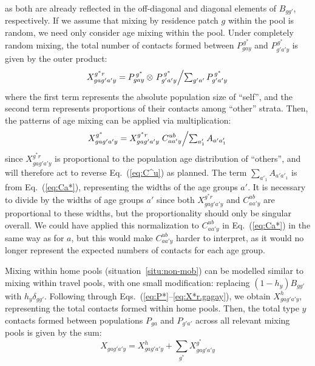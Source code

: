 as both are already reflected in the off-diagonal and diagonal elements of $B_{gg'}$, respectively.
If we assume that mixing by residence patch $g$ within the pool is random,
we need only consider age mixing within the pool.
Under completely random mixing,
the total number of contacts formed between $P^{\,g^*}_{gay}$ and $P^{\,g^*}_{g'a'y}$
is given by the outer product:
\begin{equation}\label{eq:X*r.gagay}
  X^{g^*r}_{gag'a'y} = P^{\,g^*}_{gay} \otimes
    \left. P^{\,g^*}_{g'a'y} \middle/ \textstyle\sum_{g'a'} P^{\,g^*}_{g'a'y}\right.
\end{equation}
where the first term represents the absolute population size of ``self'',
and the second term represents proportions of their contacts among ``other'' strata.
Then, the patterns of age mixing can be applied via multiplication:
\begin{equation}\label{eq:X*.gagay}
  X^{g^*}_{gag'a'y} = X^{g^*r}_{gag'a'y}
    \left.C^{ub}_{aa'y} \middle/ \textstyle\sum_{a'_1} A_{a'a'_1}\right.
\end{equation}
since $X^{g^*r}_{gag'a'y}$ is proportional to the population age distribution of ``others'',
and will therefore act to reverse Eq.~(\ref{eq:C^u}) as planned.
The term $\sum_{a'_1} A_{a'a'_1}$ is from Eq.~(\ref{eq:Ca*}),
representing the widths of the age groups $a'$.
It is necessary to divide by the widths of age groups $a'$ since
both $X^{g^*r}_{gag'a'y}$ and $C^{ub}_{aa'y}$ are proportional to these widths,
but the proportionality should only be singular overall.
We could have applied this normalization to $C^{ub}_{aa'y}$
in Eq.~(\ref{eq:Ca*}) in the same way as for $a$,
but this would make $C^{ub}_{aa'y}$ harder to interpret,
as it would no longer represent the expected numbers of contacts for each age group.
\par
Mixing within home pools (situation~\ref{situ:non-mob})
can be modelled similar to mixing within travel pools,
with one small modification: replacing $(1-h_y) B_{gg'}$ with $h_y \delta_{gg'}$.
Following through Eqs.~(\ref{eq:P*}--\ref{eq:X*r.gagay}), we obtain $X^{h}_{gag'a'y}$,
representing the total contacts formed within home pools.
Then, the total type $y$ contacts formed between populations $P_{ga}$ and $P_{g'a'}$
across all relevant mixing pools is given by the sum:
\begin{equation}\label{eq:Xgagay}
  X_{gag'a'y} = X^h_{gag'a'y} + \sum_{g^*} X^{g^*}_{gag'a'y}
\end{equation}
